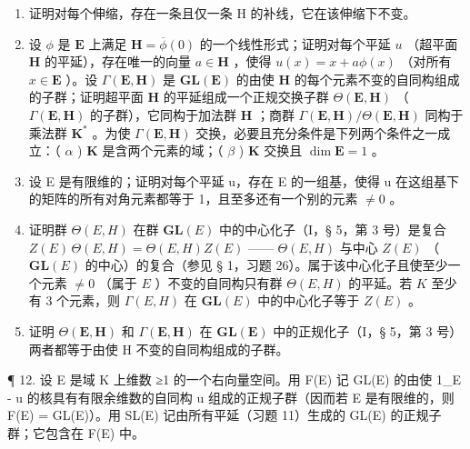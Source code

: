 \begin{enumerate}
\def\labelenumi{(\alph{enumi})}
\item
  证明对每个伸缩，存在一条且仅一条 H 的补线，它在该伸缩下不变。
\item
  设 \(\phi\) 是 \(\mathbf{E}\) 上满足 \(\mathbf{H} = \overline{\phi}(0)\) 的一个线性形式；证明对每个平延 \(u\) （超平面 \(\mathbf{H}\) 的平延），存在唯一的向量 \(a \in \mathbf{H}\) ，使得 \(u(x) = x + a\phi(x)\) （对所有 \(x \in \mathbf{E}\) ）。设 \(\Gamma(\mathbf{E}, \mathbf{H})\) 是 \(\mathbf{GL}(\mathbf{E})\) 的由使 \(\mathbf{H}\) 的每个元素不变的自同构组成的子群；证明超平面 \(\mathbf{H}\) 的平延组成一个正规交换子群 \(\Theta(\mathbf{E}, \mathbf{H})\) （ \(\Gamma(\mathbf{E}, \mathbf{H})\) 的子群），它同构于加法群 \(\mathbf{H}\) ；商群 \(\Gamma(\mathbf{E}, \mathbf{H}) / \Theta(\mathbf{E}, \mathbf{H})\) 同构于乘法群 \(\mathbf{K}^*\) 。为使 \(\Gamma(\mathbf{E}, \mathbf{H})\) 交换，必要且充分条件是下列两个条件之一成立：（ \(\alpha\) ) \(\mathbf{K}\) 是含两个元素的域；（ \(\beta\) ) \(\mathbf{K}\) 交换且 \(\dim \mathbf{E} = 1\) 。
\item
  设 E 是有限维的；证明对每个平延 u，存在 E 的一组基，使得 u 在这组基下的矩阵的所有对角元素都等于 1，且至多还有一个别的元素 \(\neq0\) 。
\item
  证明群 \(\Theta(E, H)\) 在群 \(\mathbf{GL}(E)\) 中的中心化子（I，§ 5，第 3 号）是复合 \(Z(E)\,\Theta(E, H) = \Theta(E, H)Z(E)\) —— \(\Theta(E, H)\) 与中心 \(Z(E)\) （ \(\mathbf{GL}(E)\) 的中心）的复合（参见 § 1，习题 26）。属于该中心化子且使至少一个元素 \(\neq0\) （属于 \(E\) ）不变的自同构只有群 \(\Theta(E, H)\) 的平延。若 \(K\) 至少有 3 个元素，则 \(\Gamma(E, H)\) 在 \(\mathbf{GL}(E)\) 中的中心化子等于 \(Z(E)\) 。
\item
  证明 \(\Theta(\mathbf{E},\mathbf{H})\) 和 \(\Gamma(\mathbf{E},\mathbf{H})\) 在 \(\mathbf{GL}(\mathbf{E})\) 中的正规化子（I，§ 5，第 3 号）两者都等于由使 H 不变的自同构组成的子群。
\end{enumerate}

¶ 12. 设 E 是域 K 上维数 ≥1 的一个右向量空间。用 F(E) 记 GL(E) 的由使 1\_E - u 的核具有有限余维数的自同构 u 组成的正规子群（因而若 E 是有限维的，则 F(E) = GL(E)）。用 SL(E) 记由所有平延（习题 11）生成的 GL(E) 的正规子群；它包含在 F(E) 中。

